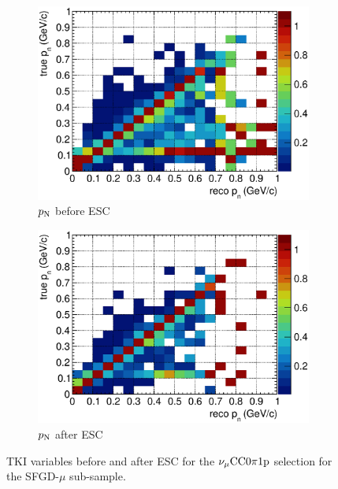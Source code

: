 \begin{figure}
          \begin{subfigure}[b]{\dbfigwid\textwidth}
               \centering
               \includegraphics[width=\textwidth]{figures/perf/tki/pn_colnor_resmat_al10_sfgmu.eps}
               \caption{$p_\textrm{N}$ before ESC}
               \label{subfig:esc-pn-bfesc-sfgmu}
          \end{subfigure}
          \begin{subfigure}[b]{\dbfigwid\textwidth}
               \centering
               \includegraphics[width=\textwidth]{figures/perf/tki/pn_colnor_resmat_al11_sfgmu.eps}
               \caption{$p_\textrm{N}$ after ESC}
               \label{subfig:esc-pn-afesc-sfgmu}
          \end{subfigure}
          \caption{TKI variables before and after ESC for the $\nu_{\mu}\textrm{CC}0\pi1\textrm{p}$ selection for the SFGD-$\mu$ sub-sample.}
          \label{fig:mc-tki-0pi-esc-sfgmu}
     \end{figure}


